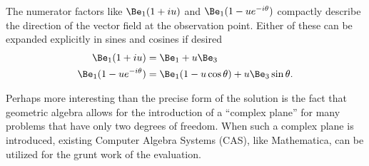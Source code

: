 The numerator factors like \( \Be_1 (1 + i u) \) and \( \Be_1(1 - u e^{-i\theta}) \)
compactly describe the direction of the vector field at the observation point.
Either of these can be expanded explicitly in sines and cosines if desired
\begin{equation}\label{eqn:linecharge:140}
\begin{aligned}
\Be_1 (1 + i u) &= \Be_1 + u \Be_3 \\
\Be_1(1 - u e^{-i\theta}) &= \Be_1(1 - u \cos\theta) + u \Be_3 \sin\theta.
\end{aligned}
\end{equation}

Perhaps more interesting than the precise form of the solution is the fact that geometric algebra allows for the introduction of a ``complex plane'' for many problems that have only two degrees of freedom.
When such a complex plane is introduced, existing Computer Algebra Systems (CAS), like Mathematica, can be utilized for the grunt work of the evaluation.

